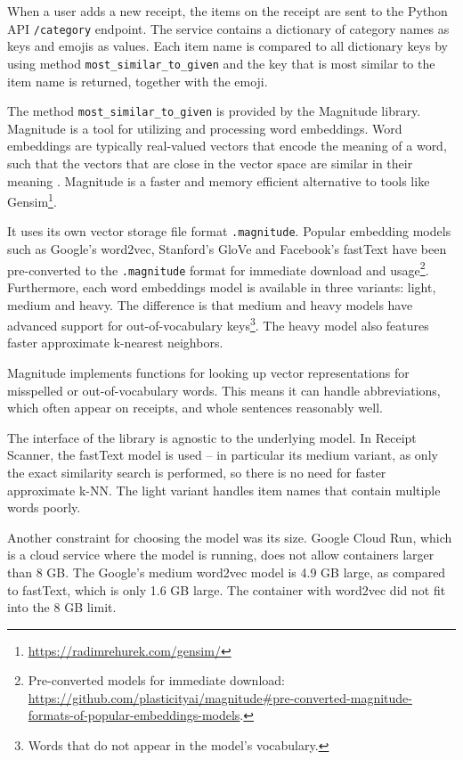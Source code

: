\documentclass[
  digital, %
  table,   %
  oneside, %
  lof,     %
  lot,     %
]{fithesis3}
\begin{document}
When a user adds a new receipt, the items on the receipt are sent to the Python API \texttt{/category} endpoint. The service contains a dictionary of category names as keys and emojis as values. Each item name is compared to all dictionary keys by using method \texttt{most\_similar\_to\_given} and the key that is most similar to the item name is returned, together with the emoji.

The method \texttt{most\_similar\_to\_given} is provided by the Magnitude library\cite{PatelEtal2018Magnitude}. Magnitude is a tool for utilizing and processing word embeddings. Word embeddings are typically real-valued vectors that encode the meaning of a word, such that the vectors that are close in the vector space are similar in their meaning \cite{Jurafsky2020Speech}. Magnitude is a faster and memory efficient alternative to tools like Gensim\footnote{\url{https://radimrehurek.com/gensim/}}. 

It uses its own vector storage file format \texttt{.magnitude}.
Popular embedding models such as Google's word2vec, Stanford's GloVe and Facebook's fastText have been pre-converted to the \texttt{.magnitude} format for immediate download and usage\footnote{Pre-converted models for immediate download: \url{https://github.com/plasticityai/magnitude\#pre-converted-magnitude-formats-of-popular-embeddings-models}.}. Furthermore, each word embeddings model is available in three variants: light, medium and heavy. The difference is that medium and heavy models have advanced support for out-of-vocabulary keys\footnote{Words that do not appear in the model's vocabulary.}. The heavy model also features faster approximate k-nearest neighbors.

Magnitude implements functions for looking up
vector representations for misspelled or out-of-vocabulary words. This means it can handle abbreviations, which often appear on receipts, and whole sentences reasonably well.

The interface of the library is agnostic to the underlying model.
In Receipt Scanner, the fastText model is used – in particular its medium variant, as only the exact similarity search is performed, so there is no need for faster approximate k-NN. The light variant handles item names that contain multiple words poorly.

Another constraint for choosing the model was its size. Google Cloud Run, which is a cloud service where the model is running, does not allow containers larger than 8 GB. The Google's medium word2vec model is 4.9 GB large, as compared to fastText, which is only 1.6 GB large. The container with word2vec did not fit into the 8 GB limit.
\end{document}
